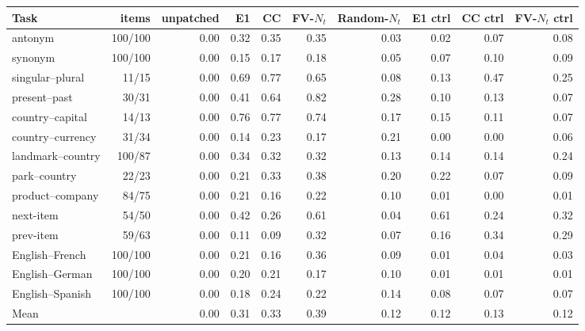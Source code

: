 \begin{tabular}{lrrrrrrrrr}
\toprule
Task & items & unpatched & E1 & CC & FV-$N_t$ & Random-$N_t$ & E1 ctrl & CC ctrl & FV-$N_t$ ctrl \\
\midrule
antonym & 100/100 & 0.00 & 0.32 & 0.35 & 0.35 & 0.03 & 0.02 & 0.07 & 0.08 \\
synonym & 100/100 & 0.00 & 0.15 & 0.17 & 0.18 & 0.05 & 0.07 & 0.10 & 0.09 \\
singular--plural & 11/15 & 0.00 & 0.69 & 0.77 & 0.65 & 0.08 & 0.13 & 0.47 & 0.25 \\
present--past & 30/31 & 0.00 & 0.41 & 0.64 & 0.82 & 0.28 & 0.10 & 0.13 & 0.07 \\
country--capital & 14/13 & 0.00 & 0.76 & 0.77 & 0.74 & 0.17 & 0.15 & 0.11 & 0.07 \\
country--currency & 31/34 & 0.00 & 0.14 & 0.23 & 0.17 & 0.21 & 0.00 & 0.00 & 0.06 \\
landmark--country & 100/87 & 0.00 & 0.34 & 0.32 & 0.32 & 0.13 & 0.14 & 0.14 & 0.24 \\
park--country & 22/23 & 0.00 & 0.21 & 0.33 & 0.38 & 0.20 & 0.22 & 0.07 & 0.09 \\
product--company & 84/75 & 0.00 & 0.21 & 0.16 & 0.22 & 0.10 & 0.01 & 0.00 & 0.01 \\
next-item & 54/50 & 0.00 & 0.42 & 0.26 & 0.61 & 0.04 & 0.61 & 0.24 & 0.32 \\
prev-item & 59/63 & 0.00 & 0.11 & 0.09 & 0.32 & 0.07 & 0.16 & 0.34 & 0.29 \\
English--French & 100/100 & 0.00 & 0.21 & 0.16 & 0.36 & 0.09 & 0.01 & 0.04 & 0.03 \\
English--German & 100/100 & 0.00 & 0.20 & 0.21 & 0.17 & 0.10 & 0.01 & 0.01 & 0.01 \\
English--Spanish & 100/100 & 0.00 & 0.18 & 0.24 & 0.22 & 0.14 & 0.08 & 0.07 & 0.07 \\
\midrule
Mean &  & 0.00 & 0.31 & 0.33 & 0.39 & 0.12 & 0.12 & 0.13 & 0.12 \\
\bottomrule
\end{tabular}
